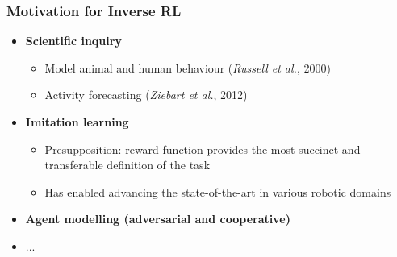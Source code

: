 \begin{frame}
	\frametitle{Motivation for Inverse RL}
	
	\Large
	
	\vspace{0.3cm}
	
	\begin{itemize}
		\item \textbf{Scientific inquiry}
			  \begin{itemize}
				  \item Model animal and human behaviour (\emph{Russell et al.}, 2000)
				  \vspace{0.15cm}
				  \item Activity forecasting (\emph{Ziebart et al.}, 2012)
			  \end{itemize}
		\vspace{0.2cm}
		\item \textbf{Imitation learning}
			  \begin{itemize}
				  \item Presupposition: reward function provides the most succinct and
				  		transferable definition of the task
				  \vspace{0.15cm}
				  \item Has enabled advancing the state-of-the-art in various robotic domains
			  \end{itemize}
		\vspace{0.2cm}
		\item \textbf{Agent modelling (adversarial and cooperative)}
		\vspace{0.2cm}
		\item ...
	\end{itemize}
\end{frame}


